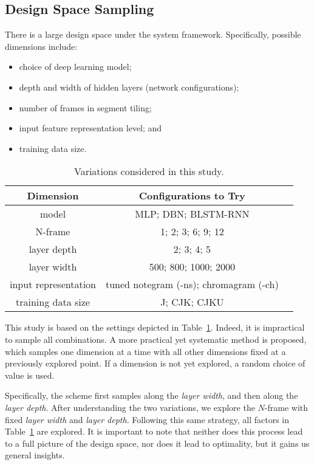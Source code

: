 \subsection{Design Space Sampling}
There is a large design space under the system framework. Specifically, possible dimensions include:
\begin{itemize}
\item choice of deep learning model; 
\item depth and width of hidden layers (network configurations);
\item number of frames in segment tiling;
\item input feature representation level; and
\item training data size.
\end{itemize}

\begin{table}
\caption{Variations considered in this study.}
\centering
\footnotesize
\begin{tabular}{|c|c|c|} \hline
Dimension & Configurations to Try \\ \hline
model & MLP; DBN; BLSTM-RNN \\ \hline
N-frame & 1; 2; 3; 6; 9; 12 \\ \hline
layer depth & 2; 3; 4; 5 \\ \hline
layer width & 500; 800; 1000; 2000 \\ \hline
input representation & tuned notegram (-ns); chromagram (-ch) \\ \hline
training data size & J; CJK; CJKU \\ \hline
\end{tabular}
\label{tab:3-varexplore}
\end{table}

This study is based on the settings depicted in Table~\ref{tab:3-varexplore}. Indeed, it is impractical to sample all combinations. A more practical yet systematic method is proposed, which samples one dimension at a time with all other dimensions fixed at a previously explored point. If a dimension is not yet explored, a random choice of value is used.

Specifically, the scheme first samples along the {\it layer width}, and then along the {\it layer depth}. After understanding the two variations, we explore the $N$-frame with fixed {\it layer width} and {\it layer depth}. Following this same strategy, all factors in Table~\ref{tab:3-varexplore} are explored. It is important to note that neither does this process lead to a full picture of the design space, nor does it lead to optimality, but it gains us general insights.

